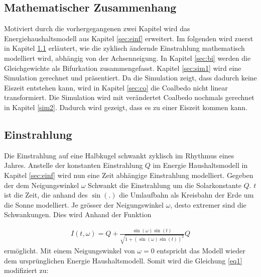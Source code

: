 \begin{refsection}
\section{Mathematischer Zusammenhang}\label{sec:math} 
Motiviert durch die vorhergegangenen zwei Kapitel wird das Energiehaushaltsmodell aus Kapitel \ref{sec:einf} erweitert. Im folgenden wird zuerst in Kapitel \ref{sec:einst} erläutert, wie die zyklisch ändernde Einstrahlung mathematisch modelliert wird, abhängig von der Achsenneigung. In Kapitel \ref{sec:bi} werden die Gleichgewichte als Bifurkation zusammengefasst. Kapitel \ref{sec:sim1} wird eine Simulation gerechnet und präsentiert. Da die Simulation zeigt, dass dadurch keine Eiszeit entstehen kann, wird in Kapitel \ref{sec:co} die Coalbedo nicht linear transformiert. Die Simulation wird mit verändertet Coalbedo nochmals gerechnet in Kapitel \ref{sim2}. Dadurch wird gezeigt, dass es zu einer Eiszeit kommen kann. 


\subsection{Einstrahlung} \label{sec:einst} 
Die Einstrahlung auf eine Halbkugel schwankt zyklisch im Rhythmus eines Jahres. Anstelle der konstanten Einstrahlung $Q$ im Energie Haushaltsmodell in Kapitel \ref{sec:einf} wird nun eine Zeit abhängige Einstrahlung modelliert. Gegeben der dem Neigungswinkel $\omega$ Schwankt die Einstrahlung um die Solarkonstante $Q$. $t$ ist die Zeit, die anhand des $\sin(.)$ die Umlaufbahn als Kreisbahn der Erde um die Sonne modelliert. Je grösser der Neigungswinkel $\omega$, desto extremer sind die Schwankungen. Dies wird Anhand der Funktion 

\begin{eqnarray*} 
I(t, \omega) = Q+\frac{\sin(\omega)\sin(t)}{\sqrt{1+(\sin(\omega) \sin(t))^2}}Q
\end{eqnarray*}
ermöglicht.  Mit einem Neigungswinkel von $\omega=0$ entspricht das Modell wieder dem ursprünglichen Energie Haushaltsmodell. Somit wird die Gleichung \eqref{eq1} modifiziert zu:


\end{refsection}
